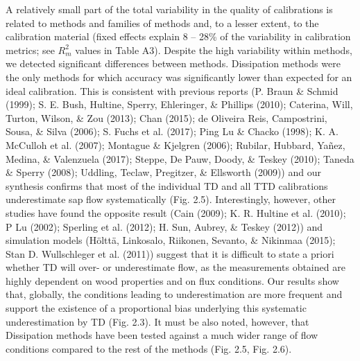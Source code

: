 \documentclass[11pt,twoside]{reedthesis}
\begin{document}
A relatively small part of the total variability in the quality of
calibrations is related to methods and families of methods and, to a
lesser extent, to the calibration material (fixed effects explain 8 --
28\% of the variability in calibration metrics; see \(R^2_m\) values in
Table A3). Despite the high variability within methods, we detected
significant differences between methods. Dissipation methods were the
only methods for which accuracy was significantly lower than expected
for an ideal calibration. This is consistent with previous reports (P.
Braun \& Schmid (1999); S. E. Bush, Hultine, Sperry, Ehleringer, \&
Phillips (2010); Caterina, Will, Turton, Wilson, \& Zou (2013); Chan
(2015); de Oliveira Reis, Campostrini, Sousa, \& Silva (2006); S. Fuchs
et al. (2017); Ping Lu \& Chacko (1998); K. A. McCulloh et al. (2007);
Montague \& Kjelgren (2006); Rubilar, Hubbard, Yañez, Medina, \&
Valenzuela (2017); Steppe, De Pauw, Doody, \& Teskey (2010); Taneda \&
Sperry (2008); Uddling, Teclaw, Pregitzer, \& Ellsworth (2009)) and our
synthesis confirms that most of the individual TD and all TTD
calibrations underestimate sap flow systematically (Fig. 2.5).
Interestingly, however, other studies have found the opposite result
(Cain (2009); K. R. Hultine et al. (2010); P Lu (2002); Sperling et al.
(2012); H. Sun, Aubrey, \& Teskey (2012)) and simulation models (Hölttä,
Linkosalo, Riikonen, Sevanto, \& Nikinmaa (2015); Stan D. Wullschleger
et al. (2011)) suggest that it is difficult to state a priori whether TD
will over- or underestimate flow, as the measurements obtained are
highly dependent on wood properties and on flux conditions. Our results
show that, globally, the conditions leading to underestimation are more
frequent and support the existence of a proportional bias underlying
this systematic underestimation by TD (Fig. 2.3). It must be also noted,
however, that Dissipation methods have been tested against a much wider
range of flow conditions compared to the rest of the methods (Fig. 2.5,
Fig. 2.6).\par
\end{document}

